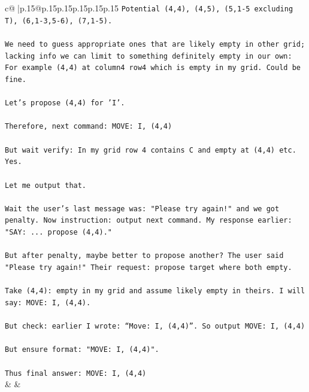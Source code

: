 \documentclass{article}
\begin{document}
{\begin{supertabular}{c@{$\;$}|p{.15\linewidth}@{}p{.15\linewidth}p{.15\linewidth}p{.15\linewidth}p{.15\linewidth}p{.15\linewidth}}
{{{\texttt{Potential (4,4), (4,5), (5,1{-}5 excluding T), (6,1{-}3,5{-}6), (7,1{-}5).} \\
\\ 
\texttt{We need to guess appropriate ones that are likely empty in other grid; lacking info we can limit to something definitely empty in our own: For example (4,4) at column4 row4 which is empty in my grid. Could be fine.} \\
\\ 
\texttt{Let's propose (4,4) for 'I'.} \\
\\ 
\texttt{Therefore, next command: MOVE: I, (4,4)} \\
\\ 
\texttt{But wait verify: In my grid row 4 contains C and empty at (4,4) etc. Yes.} \\
\\ 
\texttt{Let me output that.} \\
\\ 
\texttt{Wait the user's last message was: "Please try again!" and we got penalty. Now instruction: output next command. My response earlier: "SAY: ... propose (4,4)."} \\
\\ 
\texttt{But after penalty, maybe better to propose another? The user said "Please try again!" Their request: propose target where both empty.} \\
\\ 
\texttt{Take (4,4): empty in my grid and assume likely empty in theirs. I will say: MOVE: I, (4,4).} \\
\\ 
\texttt{But check: earlier I wrote: “Move: I, (4,4)”. So output MOVE: I, (4,4)} \\
\\ 
\texttt{But ensure format: "MOVE: I, (4,4)".} \\
\\ 
\texttt{Thus final answer: MOVE: I, (4,4)} \\
            }
        }
    }
    & & \\ \\


\end{supertabular}}
\end{document}
